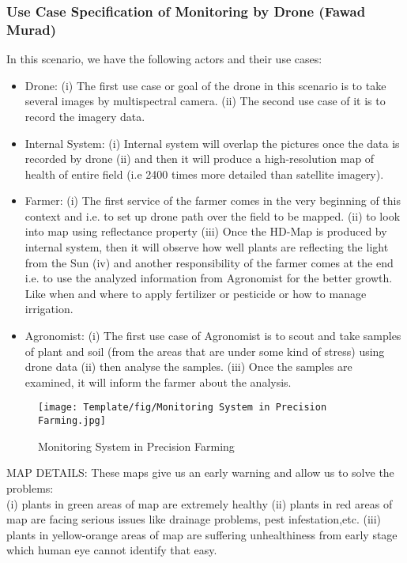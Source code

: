 \documentclass[english]{lni}
\begin{document}
\subsubsection{Use Case Specification of Monitoring by Drone  (Fawad Murad)} 
In this scenario, we have the following actors and their use cases:
\begin{itemize}
    \item Drone: (i) The first use case or goal of the drone in this scenario is to take several images by multispectral camera. (ii) The second use case of it is to record the imagery data.
    \item Internal System: (i) Internal system will overlap the pictures once the data is recorded by drone (ii) and then it will produce a high-resolution map of health of entire field (i.e 2400 times more detailed than satellite imagery).
    \item Farmer: (i) The first service of the farmer comes in the very beginning of this context and i.e. to set up drone path over the field to be mapped. (ii) to look into map using reflectance property (iii) Once the HD-Map is produced by internal system, then it will observe how well plants are reflecting the light from the Sun (iv) and another responsibility of the farmer comes at the end i.e. to use the analyzed information from Agronomist for the better growth. Like when and where to apply fertilizer or pesticide or how to manage irrigation.
    \item Agronomist: (i) The first use case of Agronomist is to scout and take samples of plant and soil (from the areas that are under some kind of stress) using drone data (ii) then analyse the samples. (iii) Once the samples are examined, it will inform the farmer about the analysis.
\end{itemize} 
\begin{figure}
    \texttt{[image: Template/fig/Monitoring System in Precision Farming.jpg]}
    \centering
    \caption{Monitoring System in Precision Farming}
\end{figure} 

MAP DETAILS: 
These maps give us an early warning and allow us to solve the problems: \\
(i) plants in green areas of map are extremely healthy  (ii) plants in red areas of map are facing serious issues like drainage problems, pest infestation,etc.  (iii) plants in yellow-orange areas of map are suffering unhealthiness from early stage which human   eye cannot identify that easy.
\end{document}

